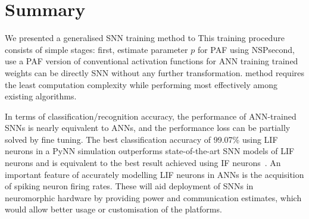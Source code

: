 \section{Summary}
	We presented a generalised \DIFaddbegin {}\DIFaddend SNN training method to \DIFdelbegin {}\DIFdelend \DIFaddbegin {}\DIFaddend This training procedure consists of \DIFdelbegin {}\DIFdelend \DIFaddbegin {}\DIFaddend simple stages: first, estimate parameter $p$ for PAF using NSP\DIFdelbegin {}\DIFdelend \DIFaddbegin \DIFadd{; }\DIFaddend second, use a PAF version of conventional activation functions for ANN training\DIFdelbegin {}\DIFdelend \DIFaddbegin \DIFadd{; }\DIFaddend %
	\DIFdelbegin {}\DIFdelend \DIFaddbegin {}\DIFaddend trained weights can be directly \DIFdelbegin {}\DIFdelend \DIFaddbegin {}\DIFaddend SNN without any further transformation.
	\DIFdelbegin {}\DIFdelend \DIFaddbegin {}\DIFaddend method requires the least computation complexity while performing most effectively among existing algorithms.

	In terms of classification/recognition accuracy, the performance of ANN-trained SNNs is nearly equivalent to ANNs, and the performance loss can be partially solved by fine tuning.
	The best classification accuracy of 99.07\% using LIF neurons in a PyNN simulation outperforms state-of-the-art SNN models of LIF neurons and is equivalent to the best result achieved using IF neurons~\citep{diehl2015fast}.
	An important feature of accurately modelling LIF neurons in ANNs is the acquisition of spiking neuron firing rates. These will aid deployment of SNNs in neuromorphic hardware by providing power and communication estimates, which would allow better usage or customisation of the platforms.